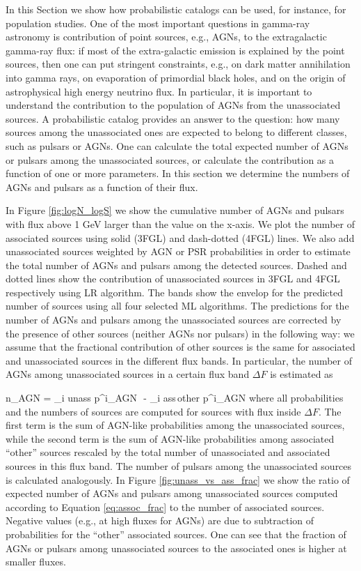 In this Section we show how probabilistic catalogs can be used, for instance, for population studies.
One of the most important questions in gamma-ray astronomy is contribution of point sources, e.g., AGNs, to the extragalactic gamma-ray
flux:
if most of the extra-galactic emission is explained by the point sources, then one can put stringent constraints, e.g., on 
dark matter annihilation into gamma rays, on evaporation of primordial black holes, and on the origin of astrophysical high energy neutrino flux.
In particular, it is important to understand the contribution to the population of AGNs from the unassociated sources.
A probabilistic catalog provides an answer to the question: how many sources among the unassociated ones are expected to belong to different classes, such as pulsars or AGNs. 
One can calculate the total expected number of AGNs or pulsars among the unassociated sources, or calculate the contribution as a function of one or more parameters.
In this section we determine the numbers of AGNs and pulsars as a function of their flux.

In Figure \ref{fig:logN_logS} we show the cumulative number of AGNs and pulsars with flux above 1 GeV larger than the
value on the x-axis.
We plot the number of associated sources using solid (3FGL) and dash-dotted (4FGL) lines.
We also add unassociated sources weighted by AGN or PSR probabilities in order to estimate the total number of AGNs and pulsars
among the detected sources.
Dashed and dotted lines show the contribution of unassociated sources in 3FGL and 4FGL respectively using LR algorithm.
The bands show the envelop for the predicted number of sources using all four selected ML algorithms.
The predictions for the number of AGNs and pulsars among the unassociated sources are corrected by the presence of other sources (neither AGNs nor pulsars) in the following way:
we assume that the fractional contribution of other sources is the same for associated and unassociated sources in the different flux bands.
In particular, the number of AGNs among unassociated sources in a certain flux band $\Delta F$ is estimated as

\be
{}
n_{\rm AGN} = \sum_{i \in \rm unass} p^i_{\rm AGN}\,\, - \sum_{i \in \rm ass\,other} p^i_{\rm AGN} \cdot 
{}
\ee
where all probabilities and the numbers of sources are computed for sources with flux inside $\Delta F$.
The first term is the sum of AGN-like probabilities among the unassociated sources,
while the second term is the sum of AGN-like probabilities among associated ``other'' sources rescaled by the total number
of unassociated and associated sources in this flux band.
The number of pulsars among the unassociated sources is calculated analogously.
In Figure \ref{fig:unass_vs_ass_frac} we show the ratio of expected number of AGNs and pulsars among unassociated sources computed according to Equation \ref{eq:assoc_frac} to the number of associated sources.
Negative values (e.g., at high fluxes for AGNs) are due to subtraction of probabilities for the ``other'' associated sources.
One can see that the fraction of AGNs or pulsars among unassociated sources to the associated ones is higher at smaller fluxes.

